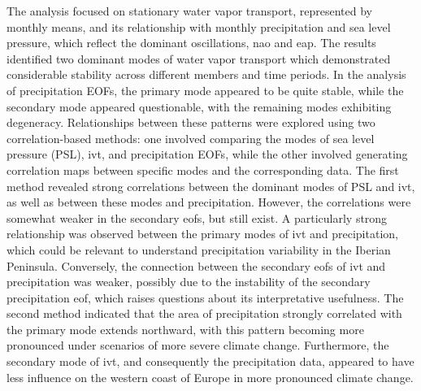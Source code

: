 The analysis focused on stationary water vapor transport, represented by monthly means, and its relationship with monthly precipitation and sea level pressure, which reflect the dominant oscillations, \ac{nao} and \ac{eap}. 
The results identified two dominant modes of water vapor transport which demonstrated considerable stability across different members and time periods.
In the analysis of precipitation EOFs, the primary mode appeared to be quite stable, while the secondary mode appeared questionable, with the remaining modes exhibiting degeneracy. 
Relationships between these patterns were explored using two correlation-based methods: one involved comparing the modes of sea level pressure (PSL), \ac{ivt}, and precipitation EOFs, while the other involved generating correlation maps between specific modes and the corresponding data.
The first method revealed strong correlations between the dominant modes of PSL and \ac{ivt}, as well as between these modes and precipitation. 
However, the correlations were somewhat weaker in the secondary \acp{eof}, but still exist. 
A particularly strong relationship was observed between the primary modes of \ac{ivt} and precipitation, which could be relevant to understand precipitation variability in the Iberian Peninsula. 
Conversely, the connection between the secondary \acp{eof} of \ac{ivt} and precipitation was weaker, possibly due to the instability of the secondary precipitation \ac{eof}, which raises questions about its interpretative usefulness.
The second method indicated that the area of precipitation strongly correlated with the primary mode extends northward, with this pattern becoming more pronounced under scenarios of more severe climate change. 
Furthermore, the secondary mode of \ac{ivt}, and consequently the precipitation data, appeared to have less influence on the western coast of Europe in more pronounced climate change.

